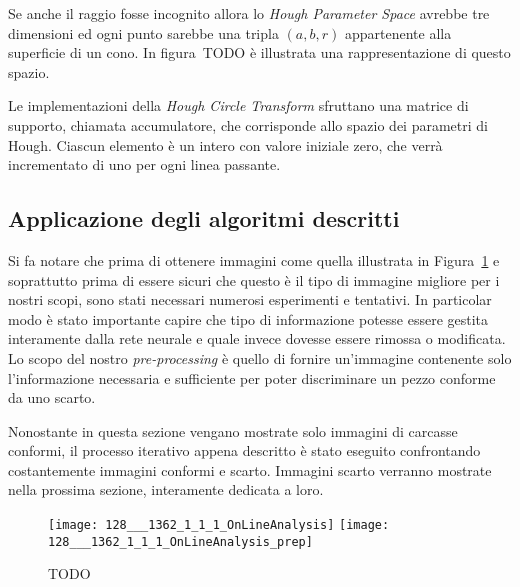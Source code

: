 Se anche il raggio fosse incognito allora lo \textit{Hough Parameter Space} avrebbe tre dimensioni ed ogni punto sarebbe una tripla $(a,b,r)$ appartenente alla superficie di un cono.
In figura~TODO è illustrata una rappresentazione di questo spazio.

Le implementazioni della \textit{Hough Circle Transform} sfruttano una matrice di supporto, chiamata accumulatore, che corrisponde allo spazio dei parametri di Hough.
Ciascun elemento è un intero con valore iniziale zero, che verrà incrementato di uno per ogni linea passante.




\clearpage
\subsection {Applicazione degli algoritmi descritti}
Si fa notare che prima di ottenere immagini come quella illustrata in Figura~\ref{fig:prima_dopo_prep} e soprattutto prima di essere sicuri che questo è il tipo di immagine migliore per i nostri scopi, sono stati necessari numerosi esperimenti e tentativi.
In particolar modo è stato importante capire che tipo di informazione potesse essere gestita interamente dalla rete neurale e quale invece dovesse essere rimossa o modificata.
Lo scopo del nostro \textit{pre-processing} è quello di fornire un'immagine contenente solo l'informazione necessaria e sufficiente per poter discriminare un pezzo conforme da uno scarto.

Nonostante in questa sezione vengano mostrate solo immagini di carcasse conformi, il processo iterativo appena descritto è stato eseguito confrontando costantemente immagini conformi e scarto.
Immagini scarto verranno mostrate nella prossima sezione, interamente dedicata a loro.

\begin{figure}[ht] %
  \begin{center}
    \texttt{[image: 128\_\_\_1362\_1\_1\_1\_OnLineAnalysis]}
    \texttt{[image: 128\_\_\_1362\_1\_1\_1\_OnLineAnalysis\_prep]}
    \label{fig:prima_dopo_prep}
    \caption{TODO }
  \end{center}
\end{figure}

